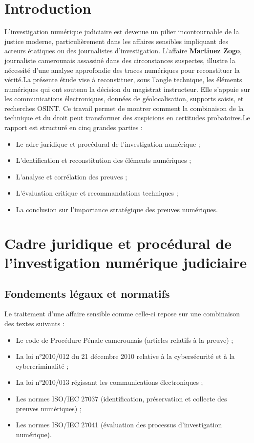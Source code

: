 \documentclass[12pt,a4paper]{report}
\begin{document}
\tableofcontents
\newpage

\chapter*{Introduction}

L’investigation numérique judiciaire est devenue un pilier incontournable de la justice moderne, particulièrement dans les affaires sensibles impliquant des acteurs étatiques ou des journalistes d’investigation. L’affaire \textbf{Martinez Zogo}, journaliste camerounais assassiné dans des circonstances suspectes, illustre la nécessité d’une analyse approfondie des traces numériques pour reconstituer la vérité.La présente étude vise à reconstituer, sous l’angle technique, les éléments numériques qui ont soutenu la décision du magistrat instructeur. Elle s’appuie sur les communications électroniques, données de géolocalisation, supports saisis, et recherches OSINT. Ce travail permet de montrer comment la combinaison de la technique et du droit peut transformer des suspicions en certitudes probatoires.Le rapport est structuré en cinq grandes parties : 
\begin{itemize}
    \item Le adre juridique et procédural de l’investigation numérique ;
    \item L'dentification et reconstitution des éléments numériques ;
    \item L'analyse et corrélation des preuves ;
    \item L'évaluation critique et recommandations techniques ;
    \item La conclusion sur l’importance stratégique des preuves numériques.
\end{itemize}

\chapter{Cadre juridique et procédural de l’investigation numérique judiciaire}

\section{Fondements légaux et normatifs}

Le traitement d’une affaire sensible comme celle-ci repose sur une combinaison des textes suivants : 
\begin{itemize}
    \item Le code de Procédure Pénale camerounais (articles relatifs à la preuve) ;
    \item La loi n°2010/012 du 21 décembre 2010 relative à la cybersécurité et à la cybercriminalité ;
    \item La loi n°2010/013 régissant les communications électroniques ;
    \item Les normes ISO/IEC 27037 (identification, préservation et collecte des preuves numériques) ;
    \item Les normes ISO/IEC 27041 (évaluation des processus d’investigation numérique).
\end{itemize}
\end{document}
